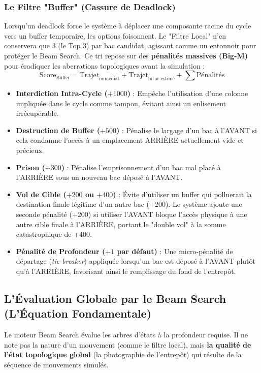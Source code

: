 \documentclass[11pt,a4paper]{article}
\begin{document}
\subsubsection{Le Filtre "Buffer" (Cassure de Deadlock)}
Lorsqu'un deadlock force le système à déplacer une composante racine du cycle vers un buffer temporaire, les options foisonnent. Le "Filtre Local" n'en conservera que 3 (le Top 3) par bac candidat, agissant comme un entonnoir pour protéger le Beam Search. Ce tri repose sur des \textbf{pénalités massives (Big-M)} pour éradiquer les aberrations topologiques avant la simulation :
\begin{equation*}
    \text{Score}_{\text{Buffer}} = \text{Trajet}_{\text{immédiat}} + \text{Trajet}_{\text{futur\_estimé}} + \sum \text{Pénalités}
\end{equation*}
\begin{itemize}[noitemsep]
    \item \textbf{Interdiction Intra-Cycle ($+1000$)} : Empêche l'utilisation d'une colonne impliquée dans le cycle comme tampon, évitant ainsi un enlisement irrécupérable.
    \item \textbf{Destruction de Buffer ($+500$)} : Pénalise le largage d'un bac à l'AVANT si cela condamne l'accès à un emplacement ARRIÈRE actuellement vide et précieux.
    \item \textbf{Prison ($+300$)} : Pénalise l'emprisonnement d'un bac mal placé à l'ARRIÈRE sous un nouveau bac déposé à l'AVANT.
    \item \textbf{Vol de Cible ($+200$ ou $+400$)} : Évite d'utiliser un buffer qui polluerait la destination finale légitime d'un autre bac (+200). Le système ajoute une seconde pénalité (+200) si utiliser l'AVANT bloque l'accès physique à une autre cible finale à l'ARRIÈRE, portant le "double vol" à la somme catastrophique de +400.
    \item \textbf{Pénalité de Profondeur ($+1$ par défaut)} : Une micro-pénalité de départage (\textit{tie-breaker}) appliquée lorsqu'un bac est déposé à l'AVANT plutôt qu'à l'ARRIÈRE, favorisant ainsi le remplissage du fond de l'entrepôt.
\end{itemize}

\subsection{L'Évaluation Globale par le Beam Search (L'Équation Fondamentale)}
Le moteur Beam Search évalue les arbres d'états à la profondeur requise. Il ne note pas la nature d'un mouvement (comme le filtre local), mais \textbf{la qualité de l'état topologique global} (la photographie de l'entrepôt) qui résulte de la séquence de mouvements simulés.
\end{document}
